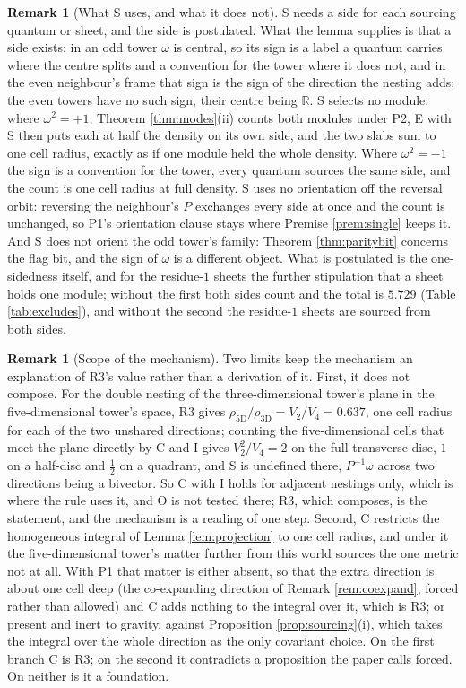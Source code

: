 \documentclass[11pt]{article}
\theoremstyle{definition}
\newtheorem{remark}[theorem]{Remark}
\newcommand{\R}{\mathbb{R}}
\begin{document}
\begin{remark}[What S uses, and what it does not]\label{rem:Sfork}
S needs a side for each sourcing quantum or sheet, and the side is postulated. What the lemma supplies is that a side exists: in an odd tower $\omega$ is central, so its sign is a label a quantum carries where the centre splits and a convention for the tower where it does not, and in the even neighbour's frame that sign is the sign of the direction the nesting adds; the even towers have no such sign, their centre being $\R$. S selects no module: where $\omega^{2} = +1$, Theorem \ref{thm:modes}(ii) counts both modules under P2, E with S then puts each at half the density on its own side, and the two slabs sum to one cell radius, exactly as if one module held the whole density. Where $\omega^{2} = -1$ the sign is a convention for the tower, every quantum sources the same side, and the count is one cell radius at full density. S uses no orientation off the reversal orbit: reversing the neighbour's $P$ exchanges every side at once and the count is unchanged, so P1's orientation clause stays where Premise \ref{prem:single} keeps it. And S does not orient the odd tower's family: Theorem \ref{thm:paritybit} concerns the flag bit, and the sign of $\omega$ is a different object. What is postulated is the one-sidedness itself, and for the residue-$1$ sheets the further stipulation that a sheet holds one module; without the first both sides count and the total is $5.729$ (Table \ref{tab:excludes}), and without the second the residue-$1$ sheets are sourced from both sides.
\end{remark}

\begin{remark}[Scope of the mechanism]\label{rem:scope}
Two limits keep the mechanism an explanation of R3's value rather than a derivation of it. First, it does not compose. For the double nesting of the three-dimensional tower's plane in the five-dimensional tower's space, R3 gives $\rho_{5\mathrm{D}}/\rho_{3\mathrm{D}} = V_{2}/V_{4} = 0.637$, one cell radius for each of the two unshared directions; counting the five-dimensional cells that meet the plane directly by C and I gives $V_{2}^{2}/V_{4} = 2$ on the full transverse disc, $1$ on a half-disc and $\tfrac{1}{2}$ on a quadrant, and S is undefined there, $P^{-1}\omega$ across two directions being a bivector. So C with I holds for adjacent nestings only, which is where the rule uses it, and O is not tested there; R3, which composes, is the statement, and the mechanism is a reading of one step. Second, C restricts the homogeneous integral of Lemma \ref{lem:projection} to one cell radius, and under it the five-dimensional tower's matter further from this world sources the one metric not at all. With P1 that matter is either absent, so that the extra direction is about one cell deep (the co-expanding direction of Remark \ref{rem:coexpand}, forced rather than allowed) and C adds nothing to the integral over it, which is R3; or present and inert to gravity, against Proposition \ref{prop:sourcing}(i), which takes the integral over the whole direction as the only covariant choice. On the first branch C is R3; on the second it contradicts a proposition the paper calls forced. On neither is it a foundation.
\end{remark}
\end{document}

